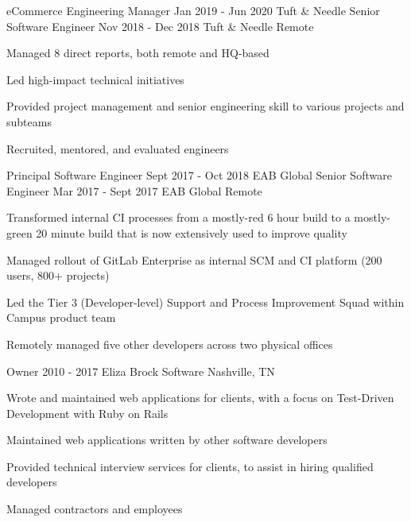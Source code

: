 \begin{cventries}
  \doublecventry
  {eCommerce Engineering Manager}
  {Jan 2019 - Jun 2020}
  {Tuft \& Needle}
  {Senior Software Engineer}
  {Nov 2018 - Dec 2018}
  {Tuft \& Needle}
  {}
  {Remote}
  {
    \begin{cvitems}
      \item Managed 8 direct reports, both remote and HQ-based
      \item Led high-impact technical initiatives
      \item Provided project management and senior engineering skill to various projects and subteams
      \item Recruited, mentored, and evaluated engineers
    \end{cvitems}
    \cvtags{
      \tagRuby
      \tagRails
      \tagPostgreSQL
      \tagAccessibility
      \tagCI
      \tagTDD
      \tagPeopleManagement
      \tagProjectManagement
    }
  }

  \doublecventry
  {Principal Software Engineer}
  {Sept 2017 - Oct 2018}
  {EAB Global}
  {Senior Software Engineer}
  {Mar 2017 - Sept 2017}
  {EAB Global}
  {}
  {Remote}
  {
    \begin{cvitems}
      \item Transformed internal CI processes from a mostly-red 6 hour build to a mostly-green 20 minute build that is now extensively used to improve quality
      \item Managed rollout of GitLab Enterprise as internal SCM and CI platform (200 users, 800+ projects)
      \item Led the Tier 3 (Developer-level) Support and Process Improvement Squad within Campus product team
      \item Remotely managed five other developers across two physical offices
    \end{cvitems}
    \cvtags{
      \tagRuby
      \tagRails
      \tagMySQL
      \tagCI
      \tagTDD
      \tagPeopleManagement
      \tagProjectManagement
    }
  }

  \cventry
  {Owner}
  {2010 - 2017}
  {Eliza Brock Software}
  {Nashville, TN}
  {
    \begin{cvitems}
      \item Wrote and maintained web applications for clients, with a focus on Test-Driven \mbox{Development} with Ruby on Rails
      \item Maintained web applications written by other software developers
      \item Provided technical interview services for clients, to assist in hiring qualified developers
      \item Managed contractors and employees
    \end{cvitems}
    \cvtags{
      \tagRuby
      \tagHAML
      \tagJavaScript
      \tagSASS
      \tagRails
      \tagPostgreSQL
      \tagCI
      \tagTDD
      \tagPairProgramming
      \tagPeopleManagement
      \tagProjectManagement
      \tagBalsamiq
      \tagPerl
      \tagPHP
    }
  }


\end{cventries}
